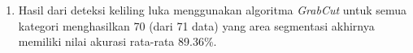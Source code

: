 \begin{enumerate}


	\item Hasil dari deteksi keliling luka menggunakan algoritma \emph{GrabCut} 
	untuk semua kategori menghasilkan 70 (dari 71 data) yang area segmentasi akhirnya 
	memiliki nilai akurasi rata-rata 89.36\%.

\end{enumerate}

